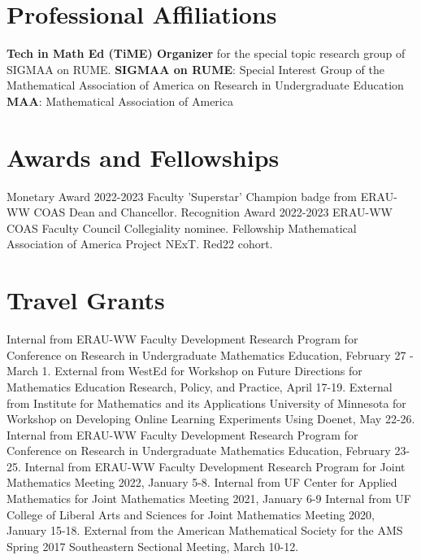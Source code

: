 \documentclass[10pt,a4paper,sans]{moderncv}
\begin{document}
	
	\section{Professional Affiliations}
	{\textbf{Tech in Math Ed (TiME) Organizer} for the special topic research group of SIGMAA on RUME.}
	{\textbf{SIGMAA on RUME}: Special Interest Group of the Mathematical Association of America on Research in Undergraduate Education}
	{\textbf{MAA}: Mathematical Association of America} 
	
	\section{Awards and Fellowships}
	{Monetary Award}
	{}
	{2022-2023 Faculty 'Superstar' Champion badge from ERAU-WW COAS Dean and Chancellor.}
	{}{}
	{Recognition Award}
	{}
	{2022-2023 ERAU-WW COAS Faculty Council Collegiality nominee.}
	{}{}
	{Fellowship}
	{}
	{Mathematical Association of America Project NExT. Red22 cohort.}
	{}{}
	\section{Travel Grants}
	{Internal}
	{}
	{from ERAU-WW Faculty Development Research Program for Conference on Research in Undergraduate Mathematics Education, February 27 - March 1.}
	{}{}
	{External}
	{}
	{from WestEd for Workshop on Future Directions for Mathematics Education Research, Policy, and Practice, April 17-19.}
	{}{}
	{External}
	{}
	{from Institute for Mathematics and its Applications University of Minnesota for Workshop on Developing Online Learning Experiments Using Doenet, May 22-26.}
	{}{}
	{Internal}
	{}
	{from ERAU-WW Faculty Development Research Program for Conference on Research in Undergraduate Mathematics Education, February 23-25.}
	{}{}
	{Internal}
	{}
	{from ERAU-WW Faculty Development Research Program for Joint Mathematics Meeting 2022, January 5-8.}
	{}{}
	{Internal}
	{}
	{from UF Center for Applied Mathematics for Joint Mathematics Meeting 2021, January 6-9}
	{}{}
	{Internal}
	{}
	{from UF College of Liberal Arts and Sciences for Joint Mathematics Meeting 2020, January 15-18.}
	{}{}
	{External}
	{}
	{from the American Mathematical Society for the AMS Spring 2017 Southeastern Sectional Meeting, March 10-12.}
	{}{}
	
\end{document}
